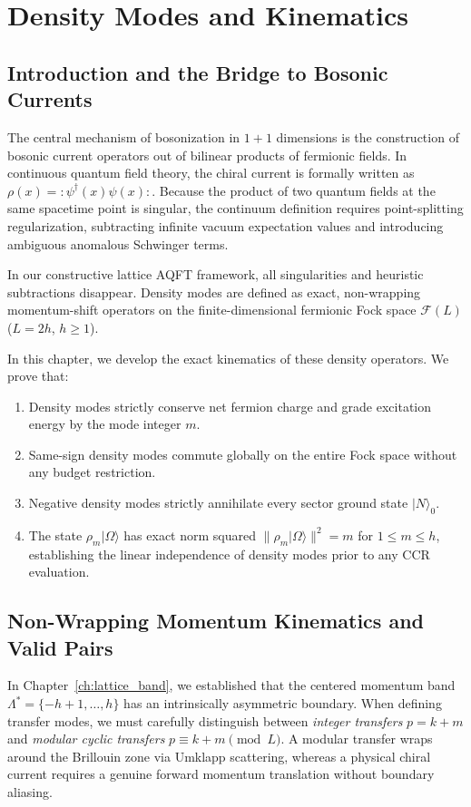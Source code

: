 \chapter{Density Modes and Kinematics}
\label{ch:density_modes}

\section{Introduction and the Bridge to Bosonic Currents}

The central mechanism of bosonization in $1+1$ dimensions is the construction of bosonic current operators out of bilinear products of fermionic fields. In continuous quantum field theory, the chiral current is formally written as $\rho(x) = :\! \psi^\dagger(x) \psi(x) \!:$. Because the product of two quantum fields at the same spacetime point is singular, the continuum definition requires point-splitting regularization, subtracting infinite vacuum expectation values and introducing ambiguous anomalous Schwinger terms.

In our constructive lattice AQFT framework, all singularities and heuristic subtractions disappear. Density modes are defined as exact, non-wrapping momentum-shift operators on the finite-dimensional fermionic Fock space $\mathcal{F}(L)$ ($L = 2h$, $h \ge 1$). 

In this chapter, we develop the exact kinematics of these density operators. We prove that:
\begin{enumerate}
    \item Density modes strictly conserve net fermion charge and grade excitation energy by the mode integer $m$.
    \item Same-sign density modes commute globally on the entire Fock space without any budget restriction.
    \item Negative density modes strictly annihilate every sector ground state $|N\rangle_0$.
    \item The state $\rho_m |\Omega\rangle$ has exact norm squared $\|\rho_m |\Omega\rangle\|^2 = m$ for $1 \le m \le h$, establishing the linear independence of density modes prior to any CCR evaluation.
\end{enumerate}

\section{Non-Wrapping Momentum Kinematics and Valid Pairs}

In Chapter~\ref{ch:lattice_band}, we established that the centered momentum band $\Lambda^* = \{-h+1, \dots, h\}$ has an intrinsically asymmetric boundary. When defining transfer modes, we must carefully distinguish between \emph{integer transfers} $p = k + m$ and \emph{modular cyclic transfers} $p \equiv k + m \pmod L$. A modular transfer wraps around the Brillouin zone via Umklapp scattering, whereas a physical chiral current requires a genuine forward momentum translation without boundary aliasing.

